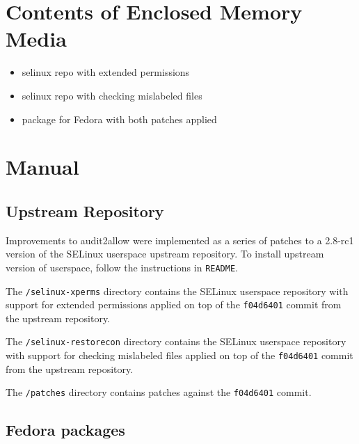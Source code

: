 
\chapter{Contents of Enclosed Memory Media}

\begin{itemize}
    \item selinux repo with extended permissions
    \item selinux repo with checking mislabeled files
    \item package for Fedora with both patches applied
\end{itemize}

\chapter{Manual}

\section{Upstream Repository}

Improvements to audit2allow were implemented as a series of patches to a 2.8-rc1
version of the SELinux userspace upstream repository. To install upstream
version of userspace, follow the instructions in \texttt{README}.

The \texttt{/selinux-xperms} directory contains the SELinux userspace repository
with support for extended permissions applied on top of the \texttt{f04d6401}
commit from the upstream repository.

The \texttt{/selinux-restorecon} directory contains the SELinux userspace
repository with support for checking mislabeled files applied on top of the
\texttt{f04d6401} commit from the upstream repository.

The \texttt{/patches} directory contains patches against the \texttt{f04d6401}
commit.

\section{Fedora packages}

